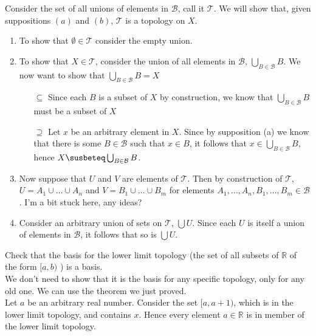 \documentclass{article}
\newcommand{\R}{\mathbb{R}}
\newcommand{\topT}{\mathcal{T}}
\begin{document}
\begin{itemize}
    Consider the set of all unions of elements in $\mathcal{B}$, call it $\mathcal{T}$. We will show that, given suppositions $(a)$ and $(b)$, $\mathcal{T}$ is a topology on $X$.
    \begin{enumerate}
        \item To show that $\emptyset\in \mathcal{T}$ consider the empty union.
        \item To show that $X\in \mathcal{T}$, consider the union of all elements in $\mathcal{B}$, $\bigcup_{B\in \mathcal{B}}B$. We now want to show that $ \bigcup_{B\in \mathcal{B}}B = X$
        \begin{itemize}
            \item[$\subseteq$] Since each $B$ is a subset of $X$ by construction, we know that $ \bigcup_{B\in \mathcal{B}}B$ must be a subset of $X$
            \item[$\supseteq$] Let $x$ be an arbitrary element in $X$. Since by supposition (a) we know that there is some $B\in \mathcal{B}$ such that $x\in B$, it follows that $x\in \bigcup_{B\in \mathcal{B}}B$, hence $X\susbeteq \bigcup_{B\in \mathcal{B}}B$.
        \end{itemize}
        \item Now suppose that $U$ and $V$ are elements of $\mathcal{T}$. Then by construction of $\mathcal{T}$, $U = A_1\cup \dots\cup A_n$ and $V = B_1\cup \dots \cup B_m$ for elements $A_1,\dots,A_n,B_1,\dots,B_m\in \mathcal{B}$. I'm a bit stuck here, any ideas?
        \item Consider an arbitrary union of sets on $\topT$, $\bigcup U$. Since each $U$ is itself a union of elements in $\mathcal{B}$, it follows that so is $\bigcup U$.
    \end{enumerate}
\end{itemize}

 Check that the basis for the lower limit topology (the set of all subsets of $\R$ of the form $[a,b)$ ) is a basis. \\

 We don't need to show that it is the basis for any specific topology, only for any old one. We can use the theorem we just proved.\\

Let $a$ be an arbitrary real number. Consider the set $[a,a+1)$, which is in the lower limit topology, and contains $x$. Hence every element $a\in \R$ is in member of the lower limit topology.\\
\end{document}
